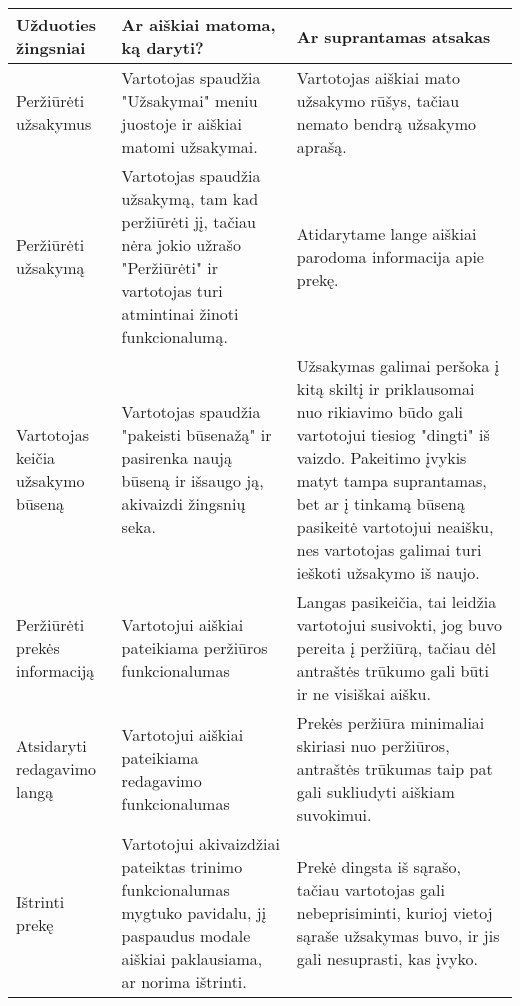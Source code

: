 \documentclass[oneside]{VUMIFPSkursinis}
\begin{document}
\begin{center}
	\begin{tabular}{ |p{3cm}| p{6cm} | p{8cm} | }
		\hline
		Užduoties žingsniai & Ar aiškiai matoma, ką daryti? & Ar suprantamas atsakas \\ \hline

		Peržiūrėti užsakymus &
		Vartotojas spaudžia "Užsakymai" meniu juostoje ir aiškiai matomi užsakymai. &
		Vartotojas aiškiai mato užsakymo rūšys, tačiau nemato bendrą užsakymo aprašą.
		\\ \hline

		Peržiūrėti užsakymą &
		Vartotojas spaudžia užsakymą, tam kad peržiūrėti jį, tačiau nėra jokio užrašo "Peržiūrėti" ir vartotojas turi atmintinai žinoti funkcionalumą. &
		Atidarytame lange aiškiai parodoma informacija apie prekę.
		\\ \hline

		Vartotojas keičia užsakymo būseną &
		Vartotojas spaudžia "pakeisti būsenažą" ir pasirenka naują būseną ir išsaugo ją, akivaizdi žingsnių seka. &
		Užsakymas galimai peršoka į kitą skiltį ir priklausomai nuo rikiavimo būdo gali vartotojui tiesiog "dingti" iš vaizdo.
		Pakeitimo įvykis matyt tampa suprantamas, bet ar į tinkamą būseną pasikeitė vartotojui neaišku, nes vartotojas galimai turi ieškoti užsakymo iš naujo.
		\\ \hline

		Peržiūrėti prekės informaciją &
		Vartotojui aiškiai pateikiama peržiūros funkcionalumas &
		Langas pasikeičia, tai leidžia vartotojui susivokti, jog buvo pereita į peržiūrą, tačiau dėl antraštės trūkumo gali būti ir ne visiškai aišku.
		\\ \hline

		Atsidaryti redagavimo langą &
		Vartotojui aiškiai pateikiama redagavimo funkcionalumas &
		Prekės peržiūra minimaliai skiriasi nuo peržiūros, antraštės trūkumas taip pat gali sukliudyti aiškiam suvokimui.
		\\ \hline

		Ištrinti prekę &
		Vartotojui akivaizdžiai pateiktas trinimo funkcionalumas mygtuko pavidalu, jį paspaudus modale aiškiai paklausiama, ar norima ištrinti. &
		Prekė dingsta iš sąrašo, tačiau vartotojas gali nebeprisiminti, kurioj vietoj sąraše užsakymas buvo, ir jis gali nesuprasti, kas įvyko.
		\\ \hline
	\end{tabular}
\end{center}


\pagebreak
\end{document}
